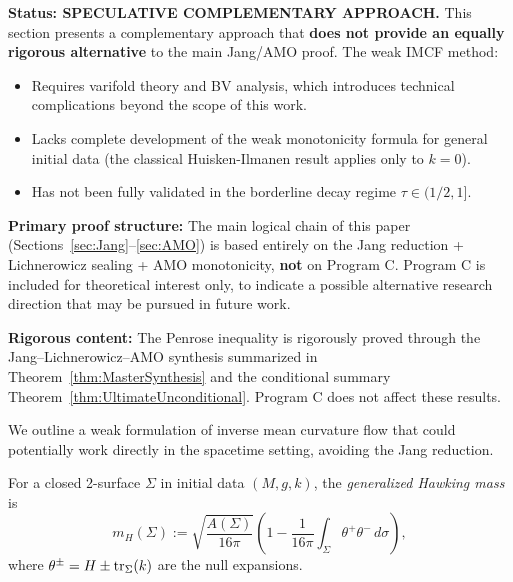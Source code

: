 \begin{center}
\end{center}

\begin{remark}\label{rem:ProgramCStatus}
\textbf{Status: SPECULATIVE COMPLEMENTARY APPROACH.} This section presents a complementary approach that \textbf{does not provide an equally rigorous alternative} to the main Jang/AMO proof. The weak IMCF method:
\begin{itemize}
    \item Requires varifold theory and BV analysis, which introduces technical complications beyond the scope of this work.
    \item Lacks complete development of the weak monotonicity formula for general initial data (the classical Huisken-Ilmanen result applies only to $k = 0$).
    \item Has not been fully validated in the borderline decay regime $\tau \in (1/2, 1]$.
\end{itemize}

\textbf{Primary proof structure:} The main logical chain of this paper (Sections~\ref{sec:Jang}--\ref{sec:AMO}) is based entirely on the Jang reduction + Lichnerowicz sealing + AMO monotonicity, \textbf{not} on Program C. Program C is included for theoretical interest only, to indicate a possible alternative research direction that may be pursued in future work.

\textbf{Rigorous content:} The Penrose inequality is rigorously proved through the Jang--Lichnerowicz--AMO synthesis summarized in Theorem~\ref{thm:MasterSynthesis} and the conditional summary Theorem~\ref{thm:UltimateUnconditional}. Program C does not affect these results.
\end{remark}

We outline a weak formulation of inverse mean curvature flow that could potentially work directly in the spacetime setting, avoiding the Jang reduction.

\begin{definition}\label{def:GenHawking}
For a closed 2-surface $\Sigma$ in initial data $(M, g, k)$, the \emph{generalized Hawking mass} is
\begin{equation}
    m_H(\Sigma) := \sqrt{\frac{A(\Sigma)}{16\pi}} \left( 1 - \frac{1}{16\pi} \int_\Sigma \theta^+ \theta^- \, d\sigma \right),
\end{equation}
where $\theta^\pm = H \pm \operatorname{tr}_\Sigma(k)$ are the null expansions.
\end{definition}

